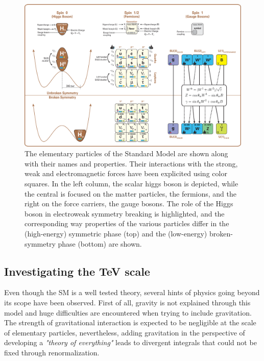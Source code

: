	\begin{figure}[H]
		\centering
		\hspace*{-0.1\linewidth}
		\includegraphics[width=1.2\linewidth]{fig/chapt2/Standard_Model_Of_Particle_Physics.png}
		\caption{\label{fig:SM} The elementary particles of the Standard Model are shown along with their names and properties. Their interactions with the strong, weak and electromagnetic forces have been explicited using color squares. In the left column, the scalar higgs boson is depicted, while the central is focused on the matter particles, the fermions, and the right on the force carriers, the gauge bosons. The role of the Higgs boson in electroweak symmetry breaking is highlighted, and the corresponding way properties of the various particles differ in the (high-energy) symmetric phase (top) and the (low-energy) broken-symmetry phase (bottom) are shown.}
	\end{figure}
	
	\subsection{Investigating the TeV scale}
	\label{chapt2:ssec:TeV}
	
	Even though the SM is a well tested theory, several hints of physics going beyond its scope have been observed. First of all, gravity is not explained through this model and huge difficulties are encountered when trying to include gravitation. The strength of gravitational interaction is expected to be negligible at the scale of elementary particles, nevertheless, adding gravitation in the perspective of developing a \textit{"theory of everything"} leads to divergent integrals that could not be fixed through renormalization.
	

